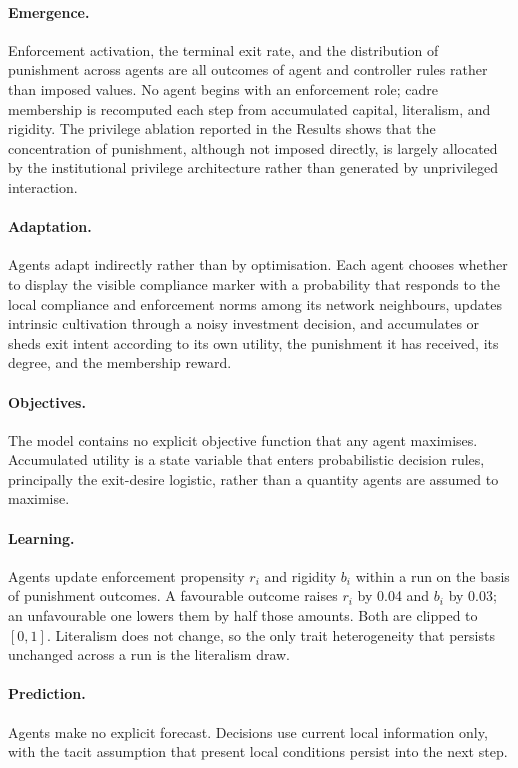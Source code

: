 \documentclass[12pt]{article}
\begin{document}
\paragraph{Emergence.} Enforcement activation, the terminal exit rate, and the
distribution of punishment across agents are all outcomes of agent and
controller rules rather than imposed values. No agent begins with an enforcement
role; cadre membership is recomputed each step from accumulated capital,
literalism, and rigidity. The privilege ablation reported in the Results shows
that the concentration of punishment, although not imposed directly, is largely
allocated by the institutional privilege architecture rather than generated by
unprivileged interaction.

\paragraph{Adaptation.} Agents adapt indirectly rather than by optimisation.
Each agent chooses whether to display the visible compliance marker with a
probability that responds to the local compliance and enforcement norms among
its network neighbours, updates intrinsic cultivation through a noisy investment
decision, and accumulates or sheds exit intent according to its own utility,
the punishment it has received, its degree, and the membership reward.

\paragraph{Objectives.} The model contains no explicit objective function that
any agent maximises. Accumulated utility is a state variable that enters
probabilistic decision rules, principally the exit-desire logistic, rather than
a quantity agents are assumed to maximise.

\paragraph{Learning.} Agents update enforcement propensity \(r_i\) and rigidity
\(b_i\) within a run on the basis of punishment outcomes. A favourable outcome
raises \(r_i\) by 0.04 and \(b_i\) by 0.03; an unfavourable one lowers them by
half those amounts. Both are clipped to \([0,1]\). Literalism does not change,
so the only trait heterogeneity that persists unchanged across a run is the
literalism draw.

\paragraph{Prediction.} Agents make no explicit forecast. Decisions use current
local information only, with the tacit assumption that present local conditions
persist into the next step.
\end{document}
